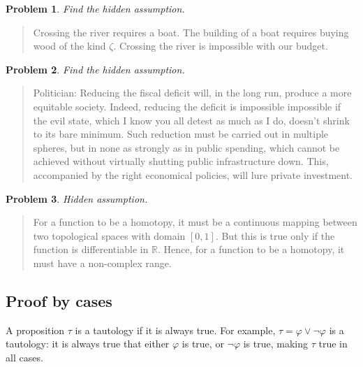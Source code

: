 \documentclass[a4paper, 12pt]{article}
\newtheorem{problem}{Problem}
\newtheorem{problem}{Problem}
\begin{document}
\begin{problem}
    Find the hidden assumption.
\end{problem}

\begin{quote}
    Crossing the river requires a boat. The building of a boat requires buying wood of 
    the kind $\zeta$. Crossing the river is impossible with our budget.
\end{quote}

\begin{problem}
    Find the hidden assumption.
\end{problem}

\begin{quote}
    Politician: Reducing the fiscal deficit will, in the long run, produce a 
    more equitable society. Indeed, reducing the deficit is impossible
    impossible if the evil state, which I know you all detest as much as I do,
    doesn't shrink to its bare minimum. Such reduction must be carried out in
    multiple spheres, but in none as strongly as in public spending, which
    cannot be achieved without virtually shutting public infrastructure down. 
    This, accompanied by the right economical policies, will lure private investment.
\end{quote}

\begin{problem}
    Hidden assumption.
\end{problem}

\begin{quote}
    For a function to be a homotopy, it must be a continuous mapping between 
    two topological spaces with domain $[0, 1]$. But this is true only if 
    the function is differentiable in $\mathbb{R}$. Hence, for a function 
    to be a homotopy, it must have a non-complex range.
\end{quote}















\pagebreak
\subsection{Proof by cases}

A proposition $\tau$ is a tautology if it is always true. For example, $\tau = \varphi \lor \neg \varphi$
is a tautology: it is always true that either $\varphi$ is true, or $\neg \varphi$ 
is true, making $\tau$ true in all cases.
\end{document}
